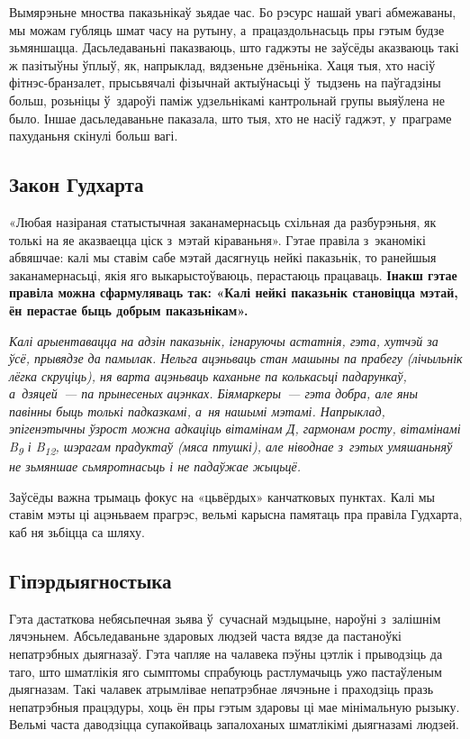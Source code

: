 Вымярэньне мноства паказьнікаў зьядае час. Бо рэсурс нашай увагі абмежаваны, мы можам губляць шмат часу на рутыну, а~працаздольнасьць пры гэтым будзе зьмяншацца. Дасьледаваньні паказваюць, што гаджэты не заўсёды аказваюць такі ж пазітыўны ўплыў, як, напрыклад, вядзеньне дзёньніка. Хаця тыя, хто насіў фітнэс-бранзалет, прысьвячалі фізычнай актыўнасьці ў~тыдзень на паўгадзіны больш, розьніцы ў~здароўі паміж удзельнікамі кантрольнай групы выяўлена не было. Іншае дасьледаваньне паказала, што тыя, хто не насіў гаджэт, у~праграме пахуданьня скінулі больш вагі.

\subsection*{Закон Гудхарта}

«Любая назіраная статыстычная заканамернасьць схільная да разбурэньня, як толькі на яе аказваецца ціск з~мэтай кіраваньня». Гэтае правіла з~эканомікі абвяшчае: калі мы ставім сабе мэтай дасягнуць нейкі паказьнік, то ранейшыя заканамернасьці, якія яго выкарыстоўваюць, перастаюць працаваць. \textbf{Інакш гэтае правіла можна сфармуляваць так: «Калі нейкі паказьнік становіцца мэтай, ён перастае быць добрым паказьнікам».}

\emph{Калі арыентавацца на адзін паказьнік, ігнаруючы астатнія, гэта, хутчэй за ўсё, прывядзе да памылак. Нельга ацэньваць стан машыны па прабегу (лічыльнік лёгка скруціць), ня варта ацэньваць каханьне па колькасьці падарункаў, а~дзяцей~--- па прынесеных ацэнках. Біямаркеры~--- гэта добра, але яны павінны быць толькі падказкамі, а~ня нашымі мэтамі. Напрыклад, эпігенэтычны ўзрост можна адкаціць вітамінам Д, гармонам росту, вітамінамі B\textsubscript{9} і B\textsubscript{12}, шэрагам прадуктаў (мяса птушкі), але ніводнае з~гэтых умяшаньняў не зьмяншае сьмяротнасьць і не падаўжае жыцьцё.}

Заўсёды важна трымаць фокус на «цьвёрдых» канчатковых пунктах. Калі мы ставім мэты ці ацэньваем прагрэс, вельмі карысна памятаць пра правіла Гудхарта, каб ня зьбіцца са шляху.

\subsection*{Гіпэрдыягностыка}

Гэта дастаткова небясьпечная зьява ў~сучаснай мэдыцыне, нароўні з~залішнім лячэньнем. Абсьледаваньне здаровых людзей часта вядзе да пастаноўкі непатрэбных дыягназаў. Гэта чапляе на чалавека пэўны цэтлік і прыводзіць да таго, што шматлікія яго сымптомы спрабуюць растлумачыць ужо пастаўленым дыягназам. Такі чалавек атрымлівае непатрэбнае лячэньне і праходзіць празь непатрэбныя працэдуры, хоць ён пры гэтым здаровы ці мае мінімальную рызыку. Вельмі часта даводзіцца супакойваць запалоханых шматлікімі дыягназамі людзей.

